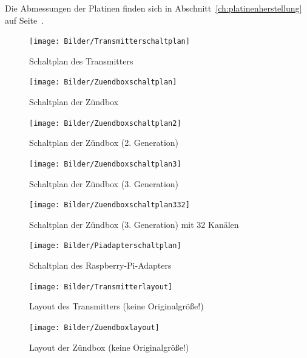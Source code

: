 \documentclass[paper=a4, parskip, numbers=noenddot, toc=listof, headsepline]{scrbook}
\begin{document}
		Die Abmessungen der Platinen finden sich in Abschnitt~\ref{ch:platinenherstellung} auf Seite~\pageref{ch:platinenherstellung}.

		\begin{figure}
			\centering
			\texttt{[image: Bilder/Transmitterschaltplan]}
			\caption{Schaltplan des Transmitters}
			\label{fig:transmitterschematic}
		\end{figure}

		\begin{figure}
			\centering
			\texttt{[image: Bilder/Zuendboxschaltplan]}
			\caption{Schaltplan der Zündbox}
			\label{fig:zuendboxschematic}
		\end{figure}

		\begin{figure}
			\centering
			\texttt{[image: Bilder/Zuendboxschaltplan2]}
			\caption{Schaltplan der Zündbox (2. Generation)}
			\label{fig:zuendbox2schematic}
		\end{figure}

		\begin{figure}
			\centering
			\texttt{[image: Bilder/Zuendboxschaltplan3]}
			\caption{Schaltplan der Zündbox (3. Generation)}
			\label{fig:zuendbox3schematic}
		\end{figure}
	
		\begin{figure}
			\centering
			\texttt{[image: Bilder/Zuendboxschaltplan332]}
			\caption{Schaltplan der Zündbox (3. Generation) mit 32 Kanälen}
			\label{fig:zuendbox332schematic}
		\end{figure}

		\begin{figure}
			\centering
			\texttt{[image: Bilder/Piadapterschaltplan]}
			\caption{Schaltplan des Raspberry-Pi-Adapters}
			\label{fig:piadapterschematic}
		\end{figure}

		\begin{figure}
			\centering
			\texttt{[image: Bilder/Transmitterlayout]}
			\caption{Layout des Transmitters (keine Originalgröße!)}
			\label{fig:transmitterlayout}
		\end{figure}

		\begin{figure}
			\centering
			\texttt{[image: Bilder/Zuendboxlayout]}
			\caption{Layout der Zündbox (keine Originalgröße!)}
			\label{fig:zuendboxlayout}
		\end{figure}
\end{document}
